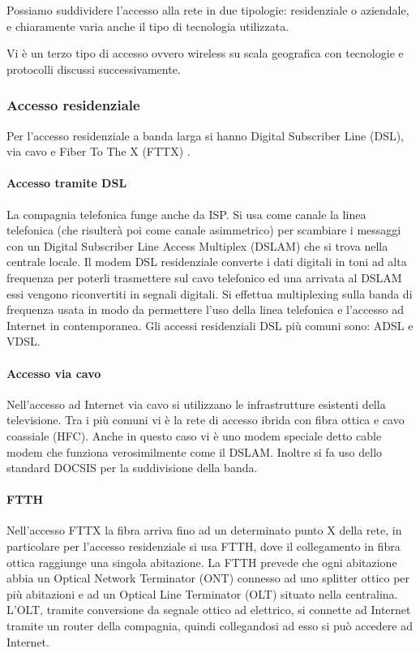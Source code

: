 \documentclass{subfiles}
\begin{document}
    Possiamo suddividere l'accesso alla rete in due tipologie: residenziale o aziendale, e chiaramente varia anche il tipo di tecnologia 
    utilizzata.
    \begin{Note*}
        Vi è un terzo tipo di accesso ovvero wireless su scala geografica con tecnologie e protocolli discussi successivamente.
    \end{Note*}

\subsubsection{Accesso residenziale}
    Per l'accesso residenziale a banda larga si hanno Digital Subscriber Line (DSL), via cavo e Fiber To The X (FTTX) .

    \paragraph{Accesso tramite DSL}
    La compagnia telefonica funge anche da ISP. Si usa come canale la linea telefonica (che risulterà poi come canale asimmetrico) per 
    scambiare i messaggi con un Digital Subscriber Line Access Multiplex (DSLAM) che si trova nella centrale locale. Il modem DSL 
    residenziale converte i dati digitali in toni ad alta frequenza per poterli trasmettere sul cavo telefonico ed una arrivata al DSLAM 
    essi vengono riconvertiti in segnali digitali. Si effettua multiplexing sulla banda di frequenza usata in modo da permettere l'uso 
    della linea telefonica e l'accesso ad Internet in contemporanea. Gli accessi residenziali DSL più comuni sono: ADSL e VDSL.

    \paragraph{Accesso via cavo}
    Nell'accesso ad Internet via cavo si utilizzano le infrastrutture esistenti della televisione. Tra i più comuni vi è la rete di 
    accesso ibrida con fibra ottica e cavo coassiale (HFC). Anche in questo caso vi è uno modem speciale detto cable modem che funziona 
    verosimilmente come il DSLAM. Inoltre si fa uso dello standard DOCSIS per la suddivisione della banda.

    \paragraph{FTTH}
    Nell'accesso FTTX la fibra arriva fino ad un determinato punto X della rete, in particolare per l'accesso residenziale si usa FTTH, 
    dove il collegamento in fibra ottica raggiunge una singola abitazione. La FTTH prevede che ogni abitazione abbia un Optical Network 
    Terminator (ONT) connesso ad uno splitter ottico per più abitazioni e ad un Optical Line Terminator (OLT) situato nella centralina. 
    L'OLT, tramite conversione da segnale ottico ad elettrico, si connette ad Internet tramite un router della compagnia, quindi 
    collegandosi ad esso si può accedere ad Internet.
\end{document}
